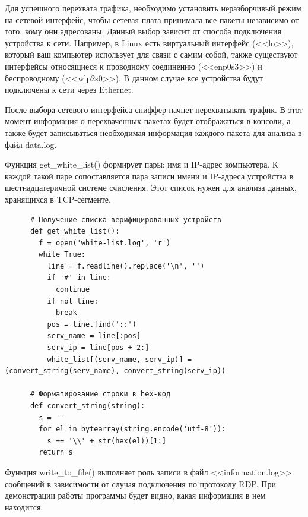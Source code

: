 \documentclass[bachelor, och, coursework]{SCWorks}
\begin{document}
  Для успешного перехвата трафика, необходимо установить неразборчивый режим на сетевой интерфейс, чтобы сетевая плата принимала
  все пакеты независимо от того, кому они адресованы. Данный выбор зависит от способа подключения устройства к сети. Например, в Linux
  есть виртуальный интерфейс (<<lo>>), который ваш компьютер использует для связи с самим собой, также существуют интерфейсы относящиеся
  к проводному соединению (<<enp0s3>>) и беспроводному (<<wlp2s0>>). В данном случае все устройства будут подключены к сети через Ethernet.
  
  После выбора сетевого интерфейса сниффер начнет перехватывать трафик. В этот момент информация о перехваченных пакетах будет отображаться
  в консоли, а также будет записываться необходимая информация каждого пакета для анализа в файл data.log.
  
    Функция get\_white\_list() формирует пары: имя и IP-адрес компьютера. К каждой такой паре сопоставляется пара записи имени и IP-адреса устройства в
    шестнадцатеричной системе счисления. Этот список нужен для анализа данных, хранящихся в TCP-сегменте.

    \begin{verbatim}
      # Получение списка верифицированных устройств
      def get_white_list():
        f = open('white-list.log', 'r')
        while True:
          line = f.readline().replace('\n', '')
          if '#' in line:
            continue
          if not line:
            break
          pos = line.find('::')
          serv_name = line[:pos]
          serv_ip = line[pos + 2:]
          white_list[(serv_name, serv_ip)] = (convert_string(serv_name), convert_string(serv_ip))

      # Форматирование строки в hex-код
      def convert_string(string):
        s = ''
        for el in bytearray(string.encode('utf-8')):
          s += '\\' + str(hex(el))[1:]
        return s
    \end{verbatim}

    Функция write\_to\_file() выполняет роль записи в файл <<information.log>> сообщений в зависимости от случая подключения по протоколу RDP. 
    При демонстрации работы программы будет видно, какая информация в нем находится.
    
\end{document}
